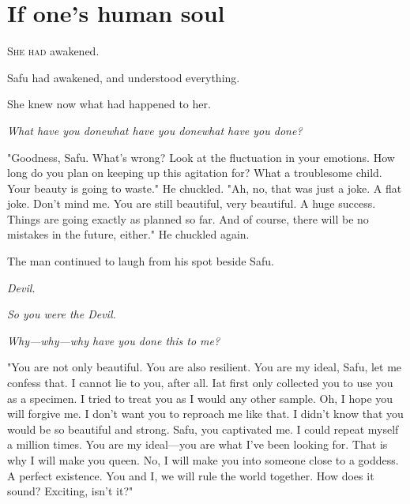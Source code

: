 
\chapter{If one's human soul}


\lettrine{S}{he had} awakened.

Safu had awakened, and understood everything.

She knew now what had happened to her.

\emph{What have you done\el what have you done\el what have you done?}

"Goodness, Safu. What's wrong? Look at the fluctuation in your emotions.
How long do you plan on keeping up this agitation for? What a
troublesome child. Your beauty is going to waste." He chuckled. "Ah, no,
that was just a joke. A flat joke. Don't mind me. You are still
beautiful, very beautiful. A huge success. Things are going exactly as
planned so far. And of course, there will be no mistakes in the future,
either." He chuckled again.

The man continued to laugh from his spot beside Safu.

\emph{Devil.}

\emph{So you were the Devil.}

\emph{Why---why---why have you done this to me?}

"You are not only beautiful. You are also resilient. You are my ideal,
Safu, let me confess that. I cannot lie to you, after all. I\el at first
only collected you to use you as a specimen. I tried to treat you as I
would any other sample. Oh, I hope you will forgive me. I don't want you
to reproach me like that. I didn't know that you would be so beautiful
and strong. Safu, you captivated me. I could repeat myself a million
times. You are my ideal---you are what I've been looking for. That is why
I will make you queen. No, I will make you into someone close to a
goddess. A perfect existence. You and I, we will rule the world
together. How does it sound? Exciting, isn't it?"

